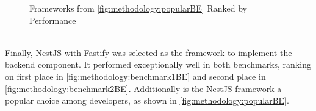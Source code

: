 \clearpage
\begin{figure}[htbp] \ContinuedFloat
  \myfloatalign
   \caption{Frameworks from \autoref{fig:methodology:popularBE} Ranked by Performance}
   \label{fig:methodology:benchmarkBE}
\end{figure}
~\\
Finally, NestJS \cite{methodology:nestjs} with Fastify was selected as the framework to implement the backend component. It performed exceptionally well in both benchmarks, ranking on first place in \autoref{fig:methodology:benchmark1BE} and second place in \autoref{fig:methodology:benchmark2BE}. Additionally is the NestJS framework a popular choice among developers, as shown in \autoref{fig:methodology:popularBE}.

